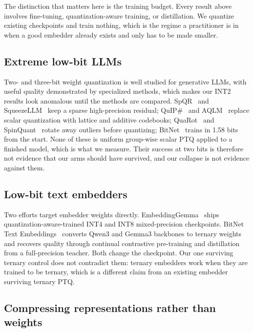 \documentclass[11pt]{article}
\begin{document}
The distinction that matters here is the training budget. Every result above involves
fine-tuning, quantization-aware training, or distillation. We quantize existing checkpoints
and train nothing, which is the regime a practitioner is in when a good embedder already
exists and only has to be made smaller.

\subsection{Extreme low-bit LLMs}

Two- and three-bit weight quantization is well studied for generative LLMs, with useful
quality demonstrated by specialized methods, which makes our INT2 results look
anomalous until the methods are compared. SpQR~\cite{spqr} and SqueezeLLM~\cite{squeezellm}
keep a sparse high-precision residual; QuIP\#~\cite{quipsharp} and AQLM~\cite{aqlm} replace
scalar quantization with lattice and additive codebooks; QuaRot~\cite{quarot} and
SpinQuant~\cite{spinquant} rotate away outliers before quantizing; BitNet~\cite{bitnet158}
trains in 1.58 bits from the start. None of these is uniform group-wise scalar PTQ applied to
a finished model, which is what we measure. Their success at two bits is therefore not
evidence that our arms should have survived, and our collapse is not evidence against them.

\subsection{Low-bit text embedders}

Two efforts target embedder weights directly. EmbeddingGemma~\cite{embgemma} ships
quantization-aware-trained INT4 and INT8 mixed-precision checkpoints. BitNet Text
Embeddings~\cite{bitembed} converts Qwen3 and Gemma3 backbones to ternary weights and
recovers quality through continual contrastive pre-training and distillation from a
full-precision teacher. Both change the checkpoint. Our one surviving ternary control does not contradict
them: ternary embedders work when they are trained to be ternary, which is a different claim
from an existing embedder surviving ternary PTQ.

\subsection{Compressing representations rather than weights}
\end{document}
